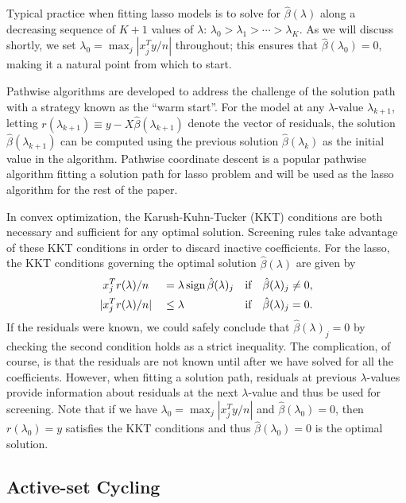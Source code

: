 Typical practice when fitting lasso models is to solve for $\hat{\beta}(\lambda)$ along a decreasing sequence of $K+1$ values of $\lambda$: $\lambda_0 > \lambda_1 > \cdots > \lambda_K$.  As we will discuss shortly, we set $\lambda_0=\max_j|x_j^Ty/n|$ throughout; this ensures that $\hat{\beta}(\lambda_0)=0$, making it a natural point from which to start.

 Pathwise algorithms are developed to address the challenge of the solution path with a strategy known as the ``warm start''. For the model at any $\lambda$-value $\lambda_{k+1}$, letting $r(\lambda_{k+1}) \equiv y-X\hat{\beta}(\lambda_{k+1})$ denote the vector of residuals, the solution $\hat{\beta}(\lambda_{k+1})$ can be computed using the previous solution $\hat{\beta}(\lambda_k)$ as the initial value in the algorithm. Pathwise coordinate descent is a popular pathwise algorithm fitting a solution path for lasso problem and will be used as the lasso algorithm for the rest of the paper.

In convex optimization, the Karush-Kuhn-Tucker (KKT) conditions are both necessary and sufficient for any optimal solution.  Screening rules take advantage of these KKT conditions in order to discard inactive coefficients.  For the lasso, the KKT conditions governing the optimal solution $\hat{\beta}(\lambda)$ are given by
\begin{equation}
  \begin{aligned}
    &x_j^Tr(\lambda)/n& &= \lambda \, \textrm{sign} \, \hat{\beta}(\lambda)_j & & \textrm{if} \quad \hat{\beta}(\lambda)_j\neq 0,\\
    |&x_j^Tr(\lambda)/n|& &\leq \lambda & & \textrm{if} \quad \hat{\beta}(\lambda)_j= 0.
  \end{aligned}
\end{equation}
If the residuals were known, we could safely conclude that $\hat{\beta}(\lambda)_j=0$ by checking the second condition holds as a strict inequality.  The complication, of course, is that the residuals are not known until after we have solved for all the coefficients.  However, when fitting a solution path, residuals at previous $\lambda$-values provide information about residuals at the next $\lambda$-value and thus be used for screening. Note that if we have $\lambda_0=\max_j|x_j^Ty/n|$ and $\hat{\beta}(\lambda_0)=0$, then $r(\lambda_0)=y$ satisfies the KKT conditions and thus $\hat{\beta}(\lambda_0)=0$ is the optimal solution.

\subsection{Active-set Cycling}
\label{sec:active}

